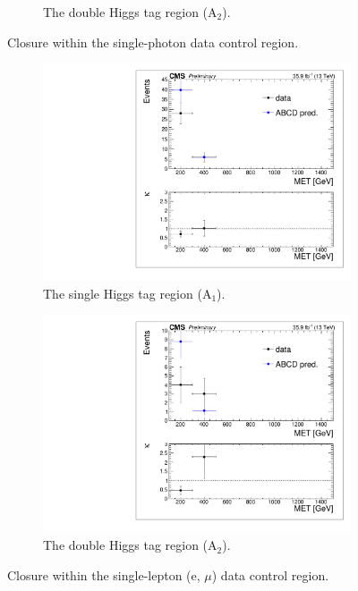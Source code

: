 \begin{figure}
\begin{subfigure}[b]{0.5\textwidth}
\caption{The double Higgs tag region (A$_{2}$).}
\end{subfigure}
\caption{Closure within the single-photon data control region.}
\label{fig:closurephoton}
\end{figure}

\begin{figure}
\begin{subfigure}[b]{0.5\textwidth}
\centering
\includegraphics[trim={5px 5px 5px 5px},clip,width=\textwidth]{figs/SUS17006/dataClosure_single-tagSR_singleLep.pdf}
\caption{The single Higgs tag region (A$_{1}$).}
\end{subfigure}
\begin{subfigure}[b]{0.5\textwidth}
\centering
\includegraphics[trim={5px 5px 5px 5px},clip,width=\textwidth]{figs/SUS17006/dataClosure_double-tagSR_singleLep.pdf} 
\caption{The double Higgs tag region (A$_{2}$).}
\end{subfigure}
\caption{Closure within the single-lepton (e, $\mu$) data control region.}
\label{fig:closuresinglelep}
\end{figure}

